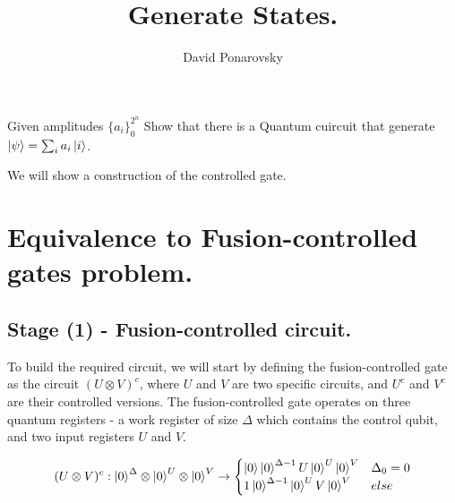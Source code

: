 \documentclass[manuscript,screen,review]{acmart}
\begin{document}


\title{Generate States.} 
\author{David Ponarovsky}

\ifdefined\ACM
\else
  \maketitle
\fi
%
\ifdefined\ACM
  \maketitle
\fi

% 



\begin{problem} Given amplitudes $\{ a_{i} \}_{0}^{2^{n}}$ Show that there is a Quantum cuircuit that generate $\ket{\psi} = \sum_{i}{a_{i}\ket{i}}$.
\end{problem}

We will show a construction of the controlled gate. 

\section{Equivalence to Fusion-controlled gates problem.}
\subsection{Stage (1) - Fusion-controlled circuit.}

To build the required circuit, we will start by defining the fusion-controlled gate as the circuit $(U\otimes V)^{c}$, where $U$ and $V$ are two specific circuits, and $U^{c}$ and $V^{c}$ are their controlled versions. The fusion-controlled gate operates on three quantum registers - a work register of size $\Delta$ which contains the control qubit, and two input registers $U$ and $V$.

\begin{equation*}
  (U\otimes V)^{c} :\ket{0}^{\Delta}\otimes \ket{0}^{U}\otimes \ket{0}^{V}   \rightarrow 
  \begin{cases}
  \ket{0} \ket{0}^{\Delta -1} U\ket{0}^{U} \ket{0}^{V} & \Delta_{0} = 0\\
1 \ket{0}^{\Delta -1} \ket{0}^{U} V\ket{0}^{V} & else
\end{cases} 
\end{equation*}
\end{document}
